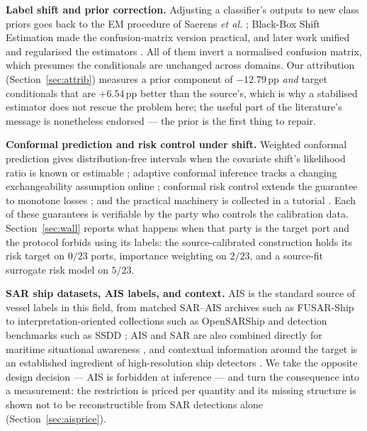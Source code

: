 \documentclass[journal]{IEEEtran}
\begin{document}
\textbf{Label shift and prior correction.} Adjusting a classifier's outputs to new class priors goes
back to the EM procedure of Saerens \emph{et al.} \cite{saerens2002adjusting}; Black-Box Shift
Estimation \cite{lipton2018bbse} made the confusion-matrix version practical, and later work unified
and regularised the estimators \cite{garg2020unified,azizzadenesheli2019regularized}. All of them
invert a normalised confusion matrix, which presumes the conditionals are unchanged across domains.
Our attribution (Section~\ref{sec:attrib}) measures a prior component of $-12.79$\,pp \emph{and}
target conditionals that are $+6.54$\,pp better than the source's, which is why a stabilised estimator
does not rescue the problem here; the useful part of the literature's message is nonetheless
endorsed --- the prior is the first thing to repair.

\textbf{Conformal prediction and risk control under shift.} Weighted conformal prediction gives
distribution-free intervals when the covariate shift's likelihood ratio is known or estimable
\cite{tibshirani2019conformal}; adaptive conformal inference tracks a changing exchangeability
assumption online \cite{gibbs2021adaptive}; conformal risk control extends the guarantee to monotone
losses \cite{angelopoulos2024riskcontrol}; and the practical machinery is collected in a tutorial
\cite{angelopoulos2021gentle}. Each of these guarantees is verifiable by the party who controls the
calibration data. Section~\ref{sec:wall} reports what happens when that party is the target port and
the protocol forbids using its labels: the source-calibrated construction holds its risk target on
$0/23$ ports, importance weighting on $2/23$, and a source-fit surrogate risk model on $5/23$.

\textbf{SAR ship datasets, AIS labels, and context.} AIS is the standard source of vessel labels in
this field, from matched SAR--AIS archives such as FUSAR-Ship \cite{hou2020fusarship} to
interpretation-oriented collections such as OpenSARShip \cite{huang2018opensarship} and detection
benchmarks such as SSDD \cite{wang2019ssdd}; AIS and SAR are also combined directly for maritime
situational awareness \cite{graziano2019integration}, and contextual information around the target is
an established ingredient of high-resolution ship detectors \cite{wang2020visualcontext}. We take the
opposite design decision --- AIS is forbidden at inference --- and turn the consequence into a
measurement: the restriction is priced per quantity and its missing structure is shown not to be
reconstructible from SAR detections alone (Section~\ref{sec:aisprice}).
\end{document}
